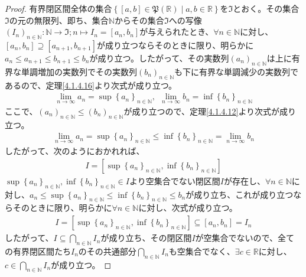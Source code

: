 \documentclass[dvipdfmx]{jsarticle}
\begin{document}
\begin{proof}
有界閉区間全体の集合$\left\{ [ a,b]\in \mathfrak{P}\left( \mathbb{R} \right) \middle| a,b \in \mathbb{R} \right\}$を$\mathfrak{I}$とおく。その集合$\mathfrak{I}$の元の無限列、即ち、集合$\mathbb{N}$からその集合$\mathfrak{I}$への写像$\left( I_{n} \right)_{n \in \mathbb{N}}:\mathbb{N}\mathfrak{\rightarrow I;}n \mapsto I_{n} = \left[ a_{n},b_{n} \right]$が与えられたとき、$\forall n \in \mathbb{N}$に対し、$\left[ a_{n},b_{n} \right] \supseteq \left[ a_{n + 1},b_{n + 1} \right]$が成り立つならそのときに限り、明らかに$a_{n} \leq a_{n + 1} \leq b_{n + 1} \leq b_{n}$が成り立つ。したがって、その実数列$\left( a_{n} \right)_{n \in \mathbb{N}}$は上に有界な単調増加の実数列でその実数列$\left( b_{n} \right)_{n \in \mathbb{N}}$も下に有界な単調減少の実数列であるので、定理\ref{4.1.4.16}より次式が成り立つ。
\begin{align*}
\lim_{n \rightarrow \infty}a_{n} = {\sup\left\{ a_{n} \right\}}_{n \in \mathbb{N}},\ \ \lim_{n \rightarrow \infty}b_{n} = {\inf\left\{ b_{n} \right\}}_{n \in \mathbb{N}}
\end{align*}
ここで、$\left( a_{n} \right)_{n \in \mathbb{N}} \leq \left( b_{n} \right)_{n \in \mathbb{N}}$が成り立つので、定理\ref{4.1.4.12}より次式が成り立つ。
\begin{align*}
\lim_{n \rightarrow \infty}a_{n} = {\sup\left\{ a_{n} \right\}}_{n \in \mathbb{N}} \leq {\inf\left\{ b_{n} \right\}}_{n \in \mathbb{N}} = \lim_{n \rightarrow \infty}b_{n}
\end{align*}
したがって、次のようにおかれれば、
\begin{align*}
I = \left[ {\sup\left\{ a_{n} \right\}}_{n \in \mathbb{N}},{\inf\left\{ b_{n} \right\}}_{n \in \mathbb{N}} \right]
\end{align*}
${\sup\left\{ a_{n} \right\}}_{n \in \mathbb{N}},{\inf\left\{ b_{n} \right\}}_{n \in \mathbb{N}} \in I$より空集合でない閉区間$I$が存在し、$\forall n \in \mathbb{N}$に対し、$a_{n} \leq {\sup\left\{ a_{n} \right\}}_{n \in \mathbb{N}} \leq {\inf\left\{ b_{n} \right\}}_{n \in \mathbb{N}} \leq b_{n}$が成り立ち、これが成り立つならそのときに限り、明らかに$\forall n \in \mathbb{N}$に対し、次式が成り立つ。
\begin{align*}
I = \left[ {\sup\left\{ a_{n} \right\}}_{n \in \mathbb{N}},{\inf\left\{ b_{n} \right\}}_{n \in \mathbb{N}} \right] \subseteq \left[ a_{n},b_{n} \right] = I_{n}
\end{align*}
したがって、$I \subseteq \bigcap_{n \in \mathbb{N}}I_{n}$が成り立ち、その閉区間$I$が空集合でないので、全ての有界閉区間たち$I_{n}$のその共通部分$\bigcap_{n \in \mathbb{N}}I_{n}$も空集合でなく、$\exists c \in \mathbb{R}$に対し、$c \in \bigcap_{n \in \mathbb{N}}I_{n}$が成り立つ。\par

\end{proof}
\end{document}
